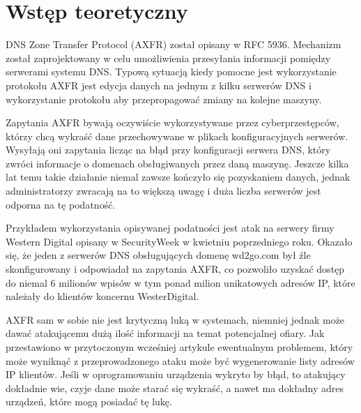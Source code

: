 \section{Wstęp teoretyczny}

DNS Zone Transfer Protocol (AXFR) został opisany w RFC 5936\cite{RFC5936}. Mechanizm został zaprojektowany w celu umożliwienia przesyłania informacji pomiędzy serwerami systemu DNS. Typową sytuacją kiedy pomocne jest wykorzystanie protokołu AXFR jest edycja danych na jednym z kilku serwerów DNS i wykorzystanie protokołu aby przepropagować zmiany na kolejne maszyny.

Zapytania AXFR bywają oczywiście wykorzystywane przez cyberprzestępców, którzy chcą wykraść dane przechowywane w plikach konfiguracyjnych serwerów. Wysyłają oni zapytania licząc na błąd przy konfiguracji serwera DNS, który zwróci informacje o domenach obsługiwanych przez daną maszynę. Jeszcze kilka lat temu takie działanie niemal zawsze kończyło się pozyskaniem danych, jednak administratorzy zwracają na to większą uwagę i duża liczba serwerów jest odporna na tę podatność.

Przykładem wykorzystania opisywanej podatności jest atak na serwery firmy Western Digital opisany w SecurityWeek \cite{wd} w kwietniu poprzedniego roku. Okazało się, że jeden z serwerów DNS obsługujących domenę wd2go.com był źle skonfigurowany i odpowiadał na zapytania AXFR, co pozwoliło uzyskać dostęp do niemal 6 milionów wpisów w tym ponad milion unikatowych adresów IP, które należały do klientów koncernu WesterDigital.

AXFR sam w sobie nie jest krytyczną luką w systemach, niemniej jednak może dawać atakującemu dużą ilość informacji na temat potencjalnej ofiary. Jak przestawiono w przytoczonym wcześniej artykule \cite{wd} ewentualnym problemem, który może wyniknąć z przeprowadzonego ataku może być wygenerowanie listy adresów IP klientów. Jeśli w oprogramowaniu urządzenia wykryto by błąd, to atakujący dokładnie wie, czyje dane może starać się wykraść, a nawet ma dokładny adres urządzeń, które mogą posiadać tę lukę.